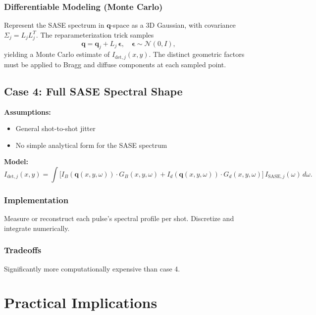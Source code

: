 \documentclass[12pt,a4paper]{article}
\begin{document}
\subsubsection*{Differentiable Modeling (Monte Carlo)}
Represent the SASE spectrum in $\mathbf{q}$-space as a 3D Gaussian, with covariance $\Sigma_j = L_j L_j^{T}$. The reparameterization trick samples
\[
\mathbf{q} = \mathbf{q}_j + L_j\,\boldsymbol{\epsilon}, \quad \boldsymbol{\epsilon} \sim \mathcal{N}(0,I),
\]
yielding a Monte Carlo estimate of $I_{\text{det},j}(x,y)$. The distinct geometric factors must be applied to Bragg and diffuse components at each sampled point.

\subsection{Case 4: Full SASE Spectral Shape}
\textbf{Assumptions:}
\begin{itemize}
\item General shot-to-shot jitter
\item No simple analytical form for the SASE spectrum
\end{itemize}
\textbf{Model:}
\begin{equation}
I_{\text{det},j}(x,y) = \int \bigl[I_B(\mathbf{q}(x,y,\omega)) \cdot G_B(x,y,\omega) + I_d(\mathbf{q}(x,y,\omega)) \cdot G_d(x,y,\omega)\bigr]\,
I_{\text{SASE},j}(\omega)\,d\omega.
\end{equation}

\subsubsection*{Implementation}
Measure or reconstruct each pulse's spectral profile per shot. Discretize and integrate numerically.

\subsubsection*{Tradeoffs}
Significantly more computationally expensive than case 4.

\section{Practical Implications}
\end{document}
